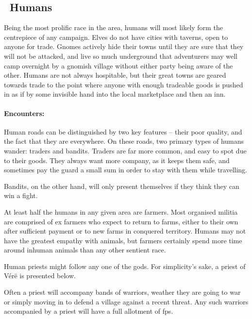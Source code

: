 \begin{multicols}{2}
\subsection[Humans]{\Hu\ Humans}

Being the most prolific race in the area, humans will most likely form the centrepiece of any campaign.  Elves do not have cities with taverns, open to anyone for trade.  Gnomes actively hide their towns until they are sure that they will not be attacked, and live so much underground that adventurers may well camp overnight by a gnomish village without either party being aware of the other.  Humans are not always hospitable, but their great towns are geared towards trade to the point where anyone with enough tradeable goods is pushed in as if by some invisible hand into the local marketplace and then an inn.

\paragraph{Encounters:} Human roads can be distinguished by two key features -- their poor quality, and the fact that they are everywhere.
On these roads, two primary types of humans wander: traders and bandits.
Traders are far more common, and easy to spot due to their goods.
They always want more company, as it keeps them safe, and sometimes pay the \gls{guard} a small sum in order to stay with them while travelling.

Bandits, on the other hand, will only present themselves if they think they can win a fight.

\label{human_trader}

At least half the humans in any given area are farmers.
Most organised militia are comprised of ex farmers who expect to return to farms, either to their own after sufficient payment or to new farms in conquered territory.
Humans may not have the greatest empathy with animals, but farmers certainly spend more time around inhuman animals than any other sentient race.


\label{human_priest}

Human priests might follow any one of the gods.
For simplicity's sake, a priest of V\'{e}r\"{e} is presented below.


Often a priest will accompany bands of warriors, weather they are going to war or simply moving in to defend a village against a recent threat.
Any such warriors accompanied by a priest will have a full allotment of \glspl{fp}.


\end{multicols}
